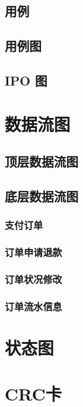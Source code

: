\documentclass{ctexart}
\begin{document}
\subsection{用例}

\subsection{用例图}

\subsection{IPO 图}


\section{数据流图}

\subsection{顶层数据流图}

\subsection{底层数据流图}

\subsubsection{支付订单}

\subsubsection{订单申请退款}

\subsubsection{订单状况修改}

\subsubsection{订单流水信息}

\section{状态图}

\section{CRC卡}
\end{document}
